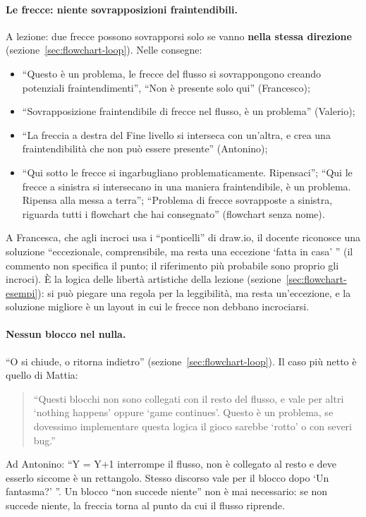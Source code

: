 \paragraph{Le frecce: niente sovrapposizioni fraintendibili.} A lezione: due
frecce possono sovrapporsi solo se vanno \textbf{nella stessa direzione}
(sezione~\ref{sec:flowchart-loop}). Nelle consegne:
\begin{itemize}
  \item ``Questo è un problema, le frecce del flusso si sovrappongono creando
        potenziali fraintendimenti'', ``Non è presente solo qui''
        (Francesco);
  \item ``Sovrapposizione fraintendibile di frecce nel flusso, è un problema''
        (Valerio);
  \item ``La freccia a destra del Fine livello si interseca con un'altra, e
        crea una fraintendibilità che non può essere presente'' (Antonino);
  \item ``Qui sotto le frecce si ingarbugliano problematicamente.
        Ripensaci''; ``Qui le frecce a sinistra si intersecano in una maniera
        fraintendibile, è un problema. Ripensa alla messa a terra'';
        ``Problema di frecce sovrapposte a sinistra, riguarda tutti i
        flowchart che hai consegnato'' (flowchart senza nome).
\end{itemize}
A Francesca, che agli incroci usa i ``ponticelli'' di draw.io, il docente
riconosce una soluzione ``eccezionale, comprensibile, ma resta una eccezione
`fatta in casa' '' (il commento non specifica il punto; il riferimento più
probabile sono proprio gli incroci). È la logica delle libertà artistiche
della lezione (sezione~\ref{sec:flowchart-esempi}): si può piegare una regola
per la leggibilità, ma resta un'eccezione, e la soluzione migliore è un
layout in cui le frecce non debbano incrociarsi.

\paragraph{Nessun blocco nel nulla.} ``O si chiude, o ritorna indietro''
(sezione~\ref{sec:flowchart-loop}). Il caso più netto è quello di Mattia:
\begin{quote}
  ``Questi blocchi non sono collegati con il resto del flusso, e vale per
  altri `nothing happens' oppure `game continues'. Questo è un problema, se
  dovessimo implementare questa logica il gioco sarebbe `rotto' o con severi
  bug.''
\end{quote}
Ad Antonino: ``Y = Y+1 interrompe il flusso, non è collegato al resto e deve
esserlo siccome è un rettangolo. Stesso discorso vale per il blocco dopo `Un
fantasma?' ''. Un blocco ``non succede niente'' non è mai necessario: se non
succede niente, la freccia torna al punto da cui il flusso riprende.

